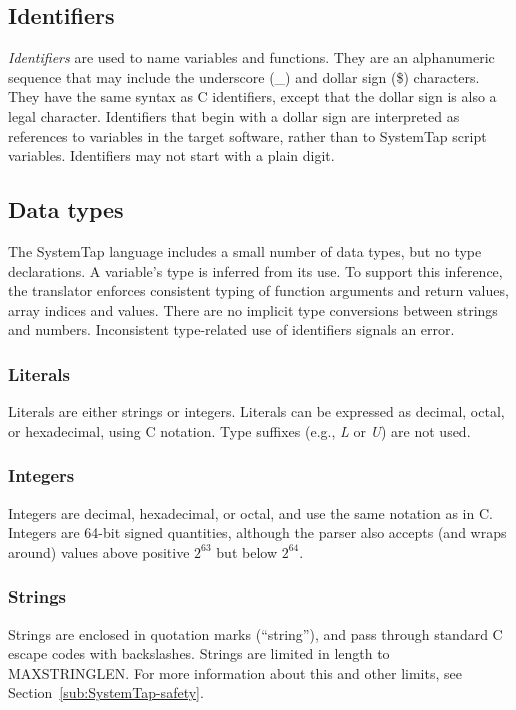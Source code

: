 \documentclass[twoside,english]{article}
\begin{document}
\subsection{Identifiers}
\emph{Identifiers} are used to name variables and functions. They are an
alphanumeric sequence that may include the underscore (\_) and dollar sign
(\$) characters. They have the same syntax as C identifiers, except that
the dollar sign is also a legal character. Identifiers that begin with a
dollar sign are interpreted as references to variables in the target software,
rather than to SystemTap script variables. Identifiers may not start with
a plain digit. 


\subsection{Data types\label{sub:Data-types}}
The SystemTap language includes a small number of data types, but no type
declarations. A variable's type is inferred from its use.
To support this inference, the translator enforces consistent typing of function
arguments and return values, array indices and values. There are no implicit
type conversions between strings and numbers. Inconsistent type-related use
of identifiers signals an error.


\subsubsection{Literals}
Literals are either strings or integers. Literals can be expressed as decimal,
octal, or hexadecimal, using C notation. Type suffixes (e.g., \emph{L} or
\emph{U}) are not used. 


\subsubsection{Integers\label{sub:Integers}}
 
Integers are decimal, hexadecimal, or octal, and use the same notation as
in C. Integers are 64-bit signed quantities, although the parser also accepts
(and wraps around) values above positive $2^{63}$ but below $2^{64}$.


\subsubsection{Strings\label{sub:Strings}}
Strings are enclosed in quotation marks ({}``string''), and pass through
standard C escape codes with backslashes. Strings are limited in length to
MAXSTRINGLEN. For more information about this and other limits, see Section~\ref{sub:SystemTap-safety}.
\end{document}
